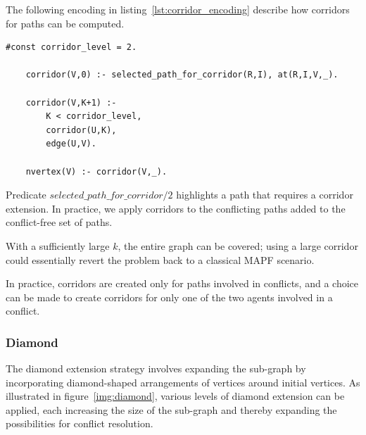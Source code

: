 The following encoding in listing~\ref{lst:corridor_encoding} describe how corridors for paths can be computed.

\begin{minipage}[H]{\linewidth}
\begin{lstlisting}[style=mystyle, caption={Corridor extension encoding}, label={lst:corridor_encoding}]
    #const corridor_level = 2.

    corridor(V,0) :- selected_path_for_corridor(R,I), at(R,I,V,_).
    
    corridor(V,K+1) :- 
        K < corridor_level,
        corridor(U,K),
        edge(U,V).

    nvertex(V) :- corridor(V,_).
\end{lstlisting}
\end{minipage}

Predicate \(selected\_path\_for\_corridor/2\) highlights a path that requires a corridor extension. In practice, we apply corridors to the conflicting paths added to the conflict-free set of paths.

With a sufficiently large \(k\), the entire graph can be covered; using a large corridor could essentially revert the problem back to a classical MAPF scenario.

In practice, corridors are created only for paths involved in conflicts, and a choice can be made to create corridors for only one of the two agents involved in a conflict.

\subsubsection{Diamond}

The diamond extension strategy involves expanding the sub-graph by incorporating diamond-shaped arrangements of vertices around initial vertices. As illustrated in figure~\ref{img:diamond}, various levels of diamond extension can be applied, each increasing the size of the sub-graph and thereby expanding the possibilities for conflict resolution.


